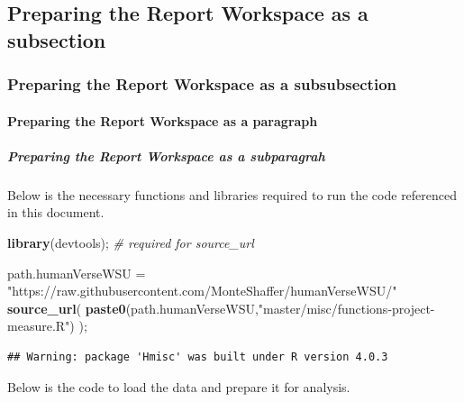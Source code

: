 \documentclass[]{article}
\newenvironment{Shaded}{\begin{snugshade}}{\end{snugshade}}
\newcommand{\CommentTok}[1]{\textcolor[rgb]{0.56,0.35,0.01}{\textit{#1}}}
\newcommand{\KeywordTok}[1]{\textcolor[rgb]{0.13,0.29,0.53}{\textbf{#1}}}
\newcommand{\NormalTok}[1]{#1}
\newcommand{\StringTok}[1]{\textcolor[rgb]{0.31,0.60,0.02}{#1}}
\begin{document}
\newpage

\subsection{Preparing the Report Workspace as a subsection}
\label{sec:appendix-setup}

\subsubsection{Preparing the Report Workspace as a subsubsection}
\label{sec:appendix-setup2}

\paragraph{Preparing the Report Workspace as a paragraph}
\label{sec:appendix-setup3}

\subparagraph{Preparing the Report Workspace as a subparagrah}
\label{sec:appendix-setup4}

Below is the necessary functions and libraries required to run the code
referenced in this document.

\begin{Shaded}
\begin{Highlighting}[]
\KeywordTok{library}\NormalTok{(devtools);       }\CommentTok{# required for source_url}

\NormalTok{path.humanVerseWSU =}\StringTok{ "https://raw.githubusercontent.com/MonteShaffer/humanVerseWSU/"}
\KeywordTok{source_url}\NormalTok{( }\KeywordTok{paste0}\NormalTok{(path.humanVerseWSU,}\StringTok{"master/misc/functions-project-measure.R"}\NormalTok{) );}
\end{Highlighting}
\end{Shaded}

\begin{verbatim}
## Warning: package 'Hmisc' was built under R version 4.0.3
\end{verbatim}

Below is the code to load the data and prepare it for analysis.
\end{document}
